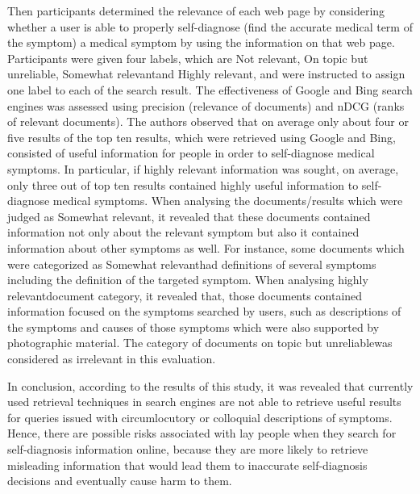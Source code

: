 \documentclass[]{article}
\begin{document}
\begin{enumerate}
Then participants determined the relevance of each web page by considering whether a user is able to properly self-diagnose (find the accurate medical term of the symptom) a medical symptom by using the information on that web page. Participants were given four labels, which are \textquotesingle Not relevant\textquotesingle, \textquotesingle On topic but unreliable\textquotesingle, \textquotesingle Somewhat relevant\textquotesingle and \textquotesingle Highly relevant\textquotesingle, and were instructed to assign one label to each of the search result. The effectiveness of Google and Bing search engines was assessed using precision (relevance of documents) and nDCG (ranks of relevant documents). The authors observed that on average only about four or five results of the top ten results, which were retrieved using Google and Bing, consisted of useful information for people in order to self-diagnose medical symptoms. In particular, if highly relevant information was sought, on average, only three out of top ten results contained highly useful information to self-diagnose medical symptoms. When analysing the documents/results which were judged as \textquotesingle Somewhat relevant\textquotesingle, it revealed that these documents contained information not only about the relevant symptom but also it contained information about other symptoms as well. For instance, some documents which were categorized as \textquotesingle Somewhat relevant\textquotesingle had definitions of several symptoms including the definition of the targeted symptom. When analysing \textquotesingle highly relevant\textquotesingle document category, it revealed that, those documents contained information focused on the symptoms searched by users, such as descriptions of the symptoms and causes of those symptoms which were also supported by photographic material. The category of documents \textquotesingle on topic but unreliable\textquotesingle was considered as irrelevant in this evaluation.  

In conclusion, according to the results of this study, it was revealed that currently used retrieval techniques in search engines are not able to retrieve useful results for queries issued with circumlocutory or colloquial descriptions of symptoms. Hence, there are possible risks associated with lay people when they search for self-diagnosis information online, because they are more likely to retrieve misleading information that would lead them to inaccurate self-diagnosis decisions and eventually cause harm to them.   


\end{enumerate}
\end{document}

